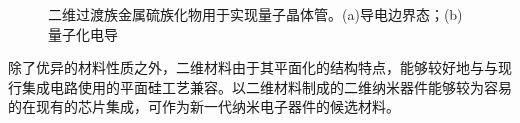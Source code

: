     \begin{figure}[htb]
        \caption{
            二维过渡族金属硫族化物用于实现量子晶体管。(a)导电边界态；(b)量子化电导
        }
    \end{figure}

    除了优异的材料性质之外，二维材料由于其平面化的结构特点，能够较好地与与现行集成电路使用的平面硅工艺兼容。以二维材料制成的二维纳米器件能够较为容易的在现有的芯片集成，可作为新一代纳米电子器件的候选材料。


